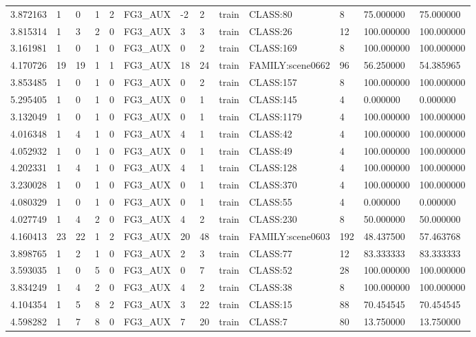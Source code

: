 \begin{tabular}{lllllllllllll}
3.872163 & 1 & 0 & 1 & 2 & FG3\_AUX & -2 & 2 & train & CLASS:80 & 8 & 75.000000 & 75.000000 \\
3.815314 & 1 & 3 & 2 & 0 & FG3\_AUX & 3 & 3 & train & CLASS:26 & 12 & 100.000000 & 100.000000 \\
3.161981 & 1 & 0 & 1 & 0 & FG3\_AUX & 0 & 2 & train & CLASS:169 & 8 & 100.000000 & 100.000000 \\
4.170726 & 19 & 19 & 1 & 1 & FG3\_AUX & 18 & 24 & train & FAMILY:scene0662 & 96 & 56.250000 & 54.385965 \\
3.853485 & 1 & 0 & 1 & 0 & FG3\_AUX & 0 & 2 & train & CLASS:157 & 8 & 100.000000 & 100.000000 \\
5.295405 & 1 & 0 & 1 & 0 & FG3\_AUX & 0 & 1 & train & CLASS:145 & 4 & 0.000000 & 0.000000 \\
3.132049 & 1 & 0 & 1 & 0 & FG3\_AUX & 0 & 1 & train & CLASS:1179 & 4 & 100.000000 & 100.000000 \\
4.016348 & 1 & 4 & 1 & 0 & FG3\_AUX & 4 & 1 & train & CLASS:42 & 4 & 100.000000 & 100.000000 \\
4.052932 & 1 & 0 & 1 & 0 & FG3\_AUX & 0 & 1 & train & CLASS:49 & 4 & 100.000000 & 100.000000 \\
4.202331 & 1 & 4 & 1 & 0 & FG3\_AUX & 4 & 1 & train & CLASS:128 & 4 & 100.000000 & 100.000000 \\
3.230028 & 1 & 0 & 1 & 0 & FG3\_AUX & 0 & 1 & train & CLASS:370 & 4 & 100.000000 & 100.000000 \\
4.080329 & 1 & 0 & 1 & 0 & FG3\_AUX & 0 & 1 & train & CLASS:55 & 4 & 0.000000 & 0.000000 \\
4.027749 & 1 & 4 & 2 & 0 & FG3\_AUX & 4 & 2 & train & CLASS:230 & 8 & 50.000000 & 50.000000 \\
4.160413 & 23 & 22 & 1 & 2 & FG3\_AUX & 20 & 48 & train & FAMILY:scene0603 & 192 & 48.437500 & 57.463768 \\
3.898765 & 1 & 2 & 1 & 0 & FG3\_AUX & 2 & 3 & train & CLASS:77 & 12 & 83.333333 & 83.333333 \\
3.593035 & 1 & 0 & 5 & 0 & FG3\_AUX & 0 & 7 & train & CLASS:52 & 28 & 100.000000 & 100.000000 \\
3.834249 & 1 & 4 & 2 & 0 & FG3\_AUX & 4 & 2 & train & CLASS:38 & 8 & 100.000000 & 100.000000 \\
4.104354 & 1 & 5 & 8 & 2 & FG3\_AUX & 3 & 22 & train & CLASS:15 & 88 & 70.454545 & 70.454545 \\
4.598282 & 1 & 7 & 8 & 0 & FG3\_AUX & 7 & 20 & train & CLASS:7 & 80 & 13.750000 & 13.750000 \\

\end{tabular}
